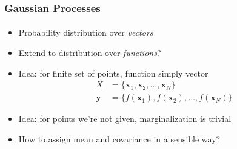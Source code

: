 \documentclass{beamer}                             %
\renewcommand{\vec}[1]{\bm{#1}}
\begin{document}
\begin{frame}
\frametitle{Gaussian Processes}
\framesubtitle{}
\begin{itemize}
  \item<+-> Probability distribution over \emph{vectors}
  \item<+-> Extend to distribution over \emph{functions}?
  \item<+-> Idea: for finite set of points, function simply vector
    \begin{align*}
      X &= \{ \vec{x}_1, \vec{x}_2, \dotsc, \vec{x}_N \} \\
      \vec{y} &= \{ f(\vec{x}_1), f(\vec{x}_2), \dotsc, f(\vec{x}_N) \}
    \end{align*}
  \item<+-> Idea: for points we're not given, marginalization is trivial
  \item<+-> How to assign mean and covariance in a sensible way?
\end{itemize}
\end{frame}
\end{document}
